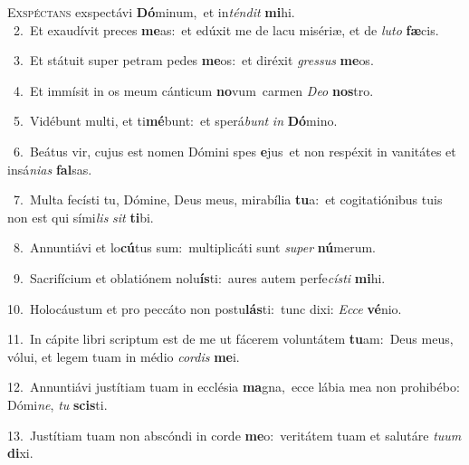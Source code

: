 \lettrine{\initial\textcolor{\initialcolor}{E}}{xspéctans} exspectávi \textbf{Dó}\-minum,~\star et in\-\textit{tén}\-\textit{dit} \textbf{mi}\-hi.\\
{\numbfont\textcolor{\numbcolor}{~2.}}~Et exaudívit preces \textbf{me}\-as:~\star et edúxit me de lacu misériæ, et de \textit{lu}\-\textit{to} \textbf{fæ}\-cis.\par
{\numbfont\textcolor{\numbcolor}{~3.}}~Et státuit super petram pedes \textbf{me}\-os:~\star et diréxit \textit{gres}\-\textit{sus} \textbf{me}\-os.\par
{\numbfont\textcolor{\numbcolor}{~4.}}~Et immísit in os meum cánticum \textbf{no}\-vum~\star carmen \textit{De}\-\textit{o} \textbf{nos}\-tro.\par
{\numbfont\textcolor{\numbcolor}{~5.}}~Vidébunt multi, et ti\-\textbf{mé}\-bunt:~\star et sperá\textit{bunt} \textit{in} \textbf{Dó}\-mino.\par
{\numbfont\textcolor{\numbcolor}{~6.}}~Beátus vir, cujus est nomen Dómini spes \textbf{e}\-jus~\star et non respéxit in vanitátes et insá\-\textit{ni}\-\textit{as} \textbf{fal}\-sas.\par
{\numbfont\textcolor{\numbcolor}{~7.}}~Multa fecísti tu, Dómine, Deus meus, mirabília \textbf{tu}\-a:~\star et cogitatiónibus tuis non est qui sími\textit{lis} \textit{sit} \textbf{ti}\-bi.\par
{\numbfont\textcolor{\numbcolor}{~8.}}~Annuntiávi et lo\-\textbf{cú}\-tus sum:~\star multiplicáti sunt \textit{su}\-\textit{per} \textbf{nú}\-merum.\par
{\numbfont\textcolor{\numbcolor}{~9.}}~Sacrifícium et oblatiónem nolu\-\textbf{ís}\-ti:~\star aures autem perfe\-\textit{cís}\-\textit{ti} \textbf{mi}\-hi.\par
{\numbfont\textcolor{\numbcolor}{10.}}~Holocáustum et pro peccáto non postu\-\textbf{lás}\-ti:~\star tunc dixi: \textit{Ec}\-\textit{ce} \textbf{vé}\-nio.\par
{\numbfont\textcolor{\numbcolor}{11.}}~In cápite libri scriptum est de me ut fácerem voluntátem \textbf{tu}\-am:~\star Deus meus, vólui, et legem tuam in médio \textit{cor}\-\textit{dis} \textbf{me}\-i.\par
{\numbfont\textcolor{\numbcolor}{12.}}~Annuntiávi justítiam tuam in ecclésia \textbf{ma}\-gna,~\star ecce lábia mea non prohibébo: Dómi\-\textit{ne}\-, \textit{tu} \textbf{scis}\-ti.\par
{\numbfont\textcolor{\numbcolor}{13.}}~Justítiam tuam non abscóndi in corde \textbf{me}\-o:~\star veritátem tuam et salutáre \textit{tu}\-\textit{um} \textbf{di}\-xi.\par
